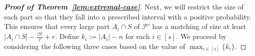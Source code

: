 \documentclass[11pt, a4paper]{article}
\theoremstyle{definition}
\newcommand{\<}{\subseteq}
\begin{document}
\begin{proof}[{\bf Proof of Theorem~\ref{lem:extremal-case}}]
Next, we will restrict the size of each part so that they fall into a prescribed interval with a positive probability.
This ensures that every large part \( A_i \cap S \) of \(\mathcal{P}'\) has a matching of size at least \( |A_i \cap S| - \frac{|S|}{r} + r \). Define $k_i:=|A_i|-n$ for each $i\in [s]$.  
We proceed by considering the following  three cases based on the value of $\max_{i\in [s]}\{k_i\}$.








\end{proof}
\end{document}
